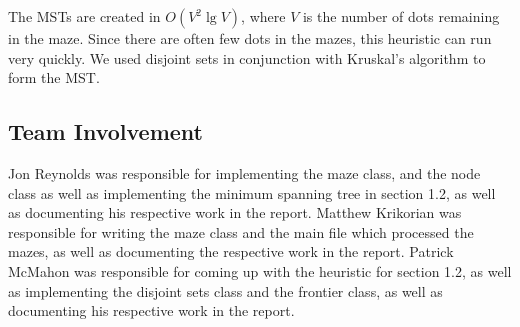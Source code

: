 \documentclass[titlepage]{article}
\begin{document}
\noindent
The MSTs are created in $O(V^2 \lg V)$, where $V$ is the number of dots remaining in the maze. Since there are often few dots in the mazes, this heuristic can run very quickly. We used disjoint sets in conjunction with Kruskal's algorithm to form the MST.



\subsection*{Team Involvement}
Jon Reynolds was responsible for implementing the maze class, and the node class as well as implementing the minimum spanning tree in section 1.2, as well as documenting his respective work in the report. Matthew Krikorian was responsible for writing the maze class and the main file which processed the mazes, as well as documenting the respective work in the report. Patrick McMahon was responsible for coming up with the heuristic for section 1.2, as well as implementing the disjoint sets class and the frontier class, as well as documenting his respective work in the report.
\end{document}
